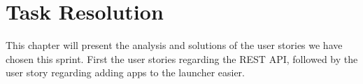 \chapter{Task Resolution}\label{chap:s3task}

This chapter will present the analysis and solutions of the user stories we have chosen this sprint.
First the user stories regarding the REST API, followed by the user story regarding adding apps to the launcher easier.






